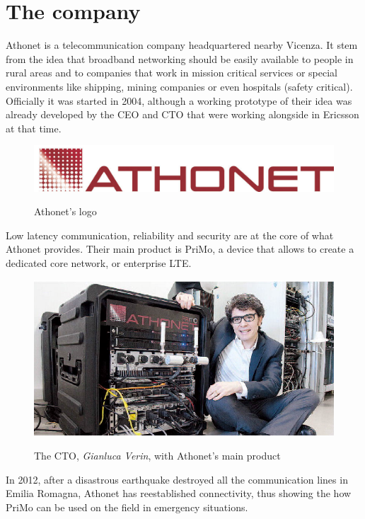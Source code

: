\section{The company}
	Athonet is a telecommunication company headquartered nearby Vicenza.
	It stem from the idea that broadband networking should be easily available to people in rural areas and to companies that work in mission critical services or special environments like shipping, mining companies or even hospitals (safety critical).\\
	Officially it was started in 2004, although a working prototype of their idea was already developed by the CEO and CTO that were working alongside in Ericsson at that time.
	\begin{figure}[H]
		\centering
		\includegraphics[width=.7\textwidth]{resources/ath_logo}\\
		\caption[Athonet's logo]{Athonet's logo}
	\end{figure}
	Low latency communication, reliability and security are at the core of what Athonet provides.
	Their main product is PriMo, a device that allows to create a dedicated core network, or enterprise LTE.
	\begin{figure}[H]
		\centering
		\includegraphics[width=.8\textwidth]{resources/gianluca_primo}\\
		\caption{The CTO, \textit{Gianluca Verin}, with Athonet's main product \textbf{}\cite{gianluca_primo}}
	\end{figure}
	In 2012, after a disastrous earthquake destroyed all the communication lines in Emilia Romagna, Athonet has reestablished connectivity, thus showing the how PriMo can be used on the field in emergency situations.\\
